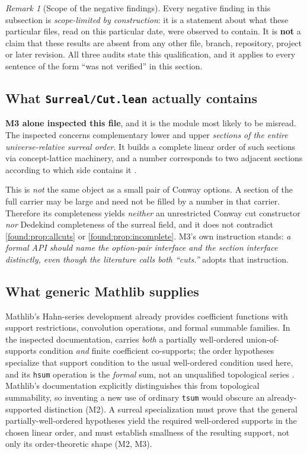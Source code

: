 \documentclass[11pt,letterpaper]{article}
\numberwithin{equation}{section}
\theoremstyle{definition}
\theoremstyle{remark}
\newtheorem{remark}[theorem]{Remark}
\begin{document}
\begin{remark}[Scope of the negative findings]\label{found:rem:scopenegative}
Every negative finding in this subsection is \emph{scope-limited by
construction}: it is a statement about what these particular files, read on this
particular date, were observed to contain. It is \textbf{not} a claim that these
results are absent from any other file, branch, repository, project or later
revision. All three audits state this qualification, and it applies to every
sentence of the form ``was not verified'' in this section.
\end{remark}

\subsection{What \texttt{Surreal/Cut.lean} actually contains}
\label{found:sub:cutfile}
\textbf{M3 alone inspected this file}, and it is the module most likely to be
misread. The inspected  concerns
complementary lower and upper \emph{sections of the entire universe-relative
surreal order}. It builds a complete linear order of such sections via
concept-lattice machinery, and a number corresponds to two adjacent sections
according to which side contains it \cite{found:GamesCut}.

This is \emph{not} the same object as a small pair of Conway options. A section
of the full carrier may be large and need not be filled by a number in that
carrier. Therefore its completeness yields \emph{neither} an unrestricted Conway
cut constructor \emph{nor} Dedekind completeness of the surreal field, and it
does not contradict \cref{found:prop:allcuts} or
\cref{found:prop:incomplete}. M3's own instruction stands: \emph{a formal API
should name the option-pair interface and the section interface distinctly, even
though the literature calls both ``cuts.''}  adopts that
instruction.

\subsection{What generic Mathlib supplies}
\label{found:sub:mathlibhahn}
Mathlib's Hahn-series development already provides coefficient functions with
support restrictions, convolution operations, and formal summable families. In
the inspected documentation,  carries
\emph{both} a partially well-ordered union-of-supports condition \emph{and}
finite coefficient co-supports; the order hypotheses specialize that support
condition to the usual well-ordered condition used here, and its \texttt{hsum}
operation is the \emph{formal} sum, not an unqualified topological series
\cite{found:MathlibHahnBasic,found:MathlibHahnSummable}. Mathlib's documentation
explicitly distinguishes this from topological summability, so inventing a new
use of ordinary \texttt{tsum} would obscure an already-supported distinction
(M2). A surreal specialization must prove that the general partially-well-ordered
hypotheses yield the required well-ordered supports in the chosen linear order,
and must establish smallness of the resulting support, not only its
order-theoretic shape (M2, M3).
\end{document}
